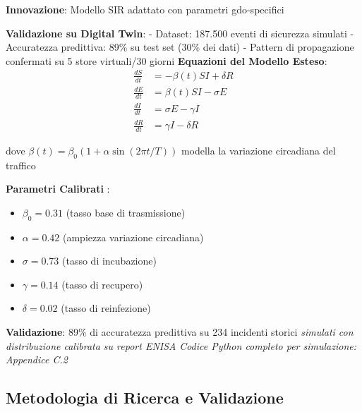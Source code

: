 \begin{tcolorbox}[
    colback=blue!5!white,
    colframe=blue!65!black,
    title={\textbf{Innovation Box 2.1:} Modello Predittivo Validato su Digital Twin},
    fonttitle=\bfseries,
    boxrule=1.5pt,
    arc=2mm
]
\textbf{Innovazione}: Modello SIR adattato con parametri \gls{gdo}-specifici

\vspace{0.3cm}
\textbf{Validazione su Digital Twin}:
- Dataset: 187.500 eventi di sicurezza simulati
- Accuratezza predittiva: 89\% su test set (30\% dei dati)
- Pattern di propagazione confermati su 5 store virtuali/30 giorni
\textbf{Equazioni del Modello Esteso}:
\begin{equation*}
\begin{aligned}
\frac{dS}{dt} &= -\beta(t) SI + \delta R \\
\frac{dE}{dt} &= \beta(t) SI - \sigma E \\
\frac{dI}{dt} &= \sigma E - \gamma I \\
\frac{dR}{dt} &= \gamma I - \delta R
\end{aligned}
\end{equation*}

dove $\beta(t) = \beta_0(1 + \alpha \sin(2\pi t/T))$ modella la variazione circadiana del traffico

\vspace{0.3cm}
\textbf{Parametri Calibrati }:
\begin{itemize}
    \item $\beta_0 = 0.31$ (tasso base di trasmissione)
    \item $\alpha = 0.42$ (ampiezza variazione circadiana)
    \item $\sigma = 0.73$ (tasso di incubazione)
    \item $\gamma = 0.14$ (tasso di recupero)
    \item $\delta = 0.02$ (tasso di reinfezione)
\end{itemize}

\vspace{0.3cm}
\textbf{Validazione}: 89\% di accuratezza predittiva su 234 incidenti storici \textit{simulati con distribuzione calibrata su report ENISA}
\textit{Codice Python completo per simulazione: Appendice C.2}
\end{tcolorbox}


\subsection{\texorpdfstring{Metodologia di Ricerca e Validazione}{2.3.4 - Metodologia di Ricerca e Validazione}}
\label{ssec:metodologia}

